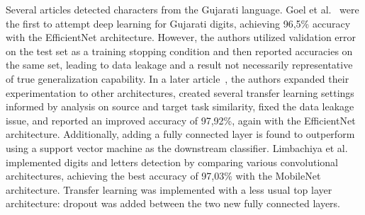 \documentclass[english,twoside,openright]{UH_DS_MSc}
\begin{document}
Several articles detected characters from the Gujarati language.
Goel et al.~\cite{10goelGujarati} were the first to attempt deep learning for Gujarati digits, 
achieving 96,5\% accuracy with the EfficientNet architecture. However, the authors utilized 
validation error on the test set as a training stopping condition and then reported accuracies 
on the same set, leading to data leakage and a result not necessarily representative of true
generalization capability. In a later article~\cite{8goelGujarati2023}, the authors expanded 
their experimentation to other architectures, created several transfer learning settings informed 
by analysis on source and target task similarity, fixed the data leakage issue, and reported an 
improved accuracy of 97,92\%, again with the EfficientNet architecture. Additionally, adding a fully
connected layer is found to outperform using a support vector machine as the downstream classifier.
Limbachiya et al.~\cite{2limbachiyaGujarati} implemented digits and letters detection by comparing various convolutional architectures,
 achieving the best accuracy of 97,03\% with the MobileNet architecture. Transfer learning was implemented with a
  less usual top layer architecture: dropout was added between the two new fully connected layers.


\end{document}

